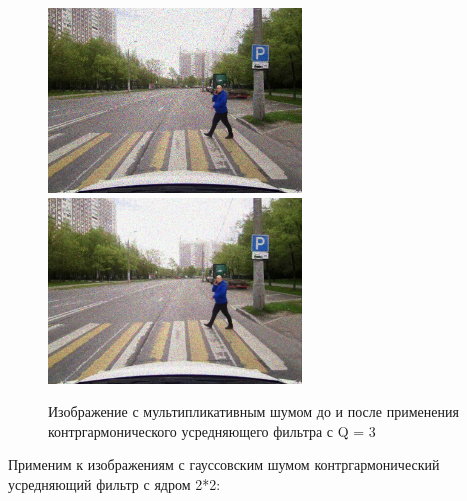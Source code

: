 \begin{figure}[hbt!]
    \centering
    \includegraphics[width=0.6\textwidth]{../outputs/image_mltp_noise.png}
    \includegraphics[width=0.6\textwidth]{../addition/image_mltp_countergarmonic_filter_Q3.png}
    \caption{Изображение с мультипликативным шумом до и после применения контргармонического усредняющего фильтра с Q = 3}
    \label{fig:stich_images}
\end{figure}

Применим к изображениям с гауссовским шумом контргармонический усредняющий фильтр с ядром 2*2:

